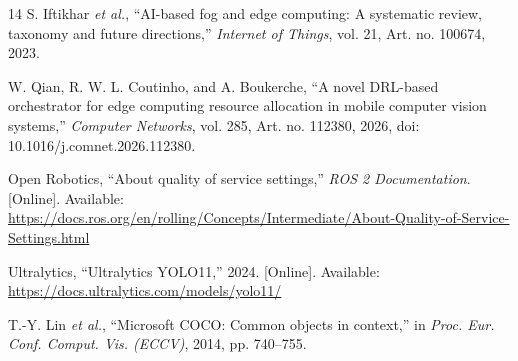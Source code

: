 \documentclass[conference,a4paper]{IEEEtran}
\newcommand{\etal}{\emph{et al.}}
\begin{document}
\begin{thebibliography}{14}
S. Iftikhar \etal, ``AI-based fog and edge computing: A systematic review, taxonomy and future directions,'' \emph{Internet of Things}, vol. 21, Art. no. 100674, 2023.

W. Qian, R. W. L. Coutinho, and A. Boukerche, ``A novel DRL-based orchestrator for edge computing resource allocation in mobile computer vision systems,'' \emph{Computer Networks}, vol. 285, Art. no. 112380, 2026, doi: 10.1016/j.comnet.2026.112380.

Open Robotics, ``About quality of service settings,'' \emph{ROS 2 Documentation}. [Online]. Available: \url{https://docs.ros.org/en/rolling/Concepts/Intermediate/About-Quality-of-Service-Settings.html}

Ultralytics, ``Ultralytics YOLO11,'' 2024. [Online]. Available: \url{https://docs.ultralytics.com/models/yolo11/}

T.-Y. Lin \etal, ``Microsoft COCO: Common objects in context,'' in \emph{Proc. Eur. Conf. Comput. Vis. (ECCV)}, 2014, pp. 740--755.

\end{thebibliography}
\end{document}
